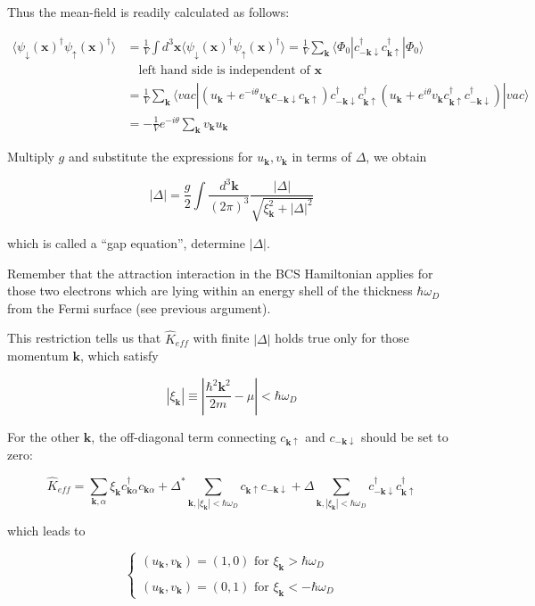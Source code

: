 Thus the mean-field is readily calculated as follows: %

\[\begin{split}
\langle\psi_{\downarrow}(\bm{x})^\dagger\psi_{\uparrow}(\bm{x})^\dagger\rangle &= \frac{1}{V}\int d^3 \bm{x} \langle\psi_{\downarrow}(\bm{x})^\dagger\psi_{\uparrow}(\bm{x})^\dagger\rangle = \frac{1}{V} \sum_{\bm{k}}\langle\Phi_0|c_{-\bm{k}\downarrow}^\dagger c_{\bm{k}\uparrow}^\dagger|\Phi_0\rangle \\
&\quad\text{left hand side is independent of }\bm{x}\\
&= \frac{1}{V}\sum_{\bm{k}}\langle vac|(u_{\bm{k}}+e^{-i\theta}v_{\bm{k}}c_{-\bm{k}\downarrow}c_{\bm{k}\uparrow})c_{-\bm{k}\downarrow}^\dagger c_{\bm{k}\uparrow}^\dagger (u_{\bm{k}}+e^{i\theta}v_{\bm{k}}c_{\bm{k}\uparrow}^\dagger c_{-\bm{k}\downarrow}^\dagger)|vac\rangle\\
&= -\frac{1}{V}e^{-i\theta}\sum_{\bm{k}}v_{\bm{k}}u_{\bm{k}}
\end{split}\]

Multiply $g$ and substitute the expressions for $u_{\bm{k}}, v_{\bm{k}}$ in terms of $\Delta$, we obtain

\[|\Delta| = \frac{g}{2}\int \frac{d^3 \bm{k}}{(2\pi)^3}\frac{|\Delta|}{\sqrt{\xi_{\bm{k}}^2+|\Delta|^2}} \]

which is called a ``gap equation'', determine $|\Delta|$. 

Remember that the attraction interaction in the BCS Hamiltonian applies for those two electrons which are lying within an energy shell of the thickness $\hbar \omega_D$ from the Fermi surface (see previous argument).

This restriction tells us that $\hat{K}_{eff}$ with finite $|\Delta|$ holds true only for those momentum $\bm{k}$, which satisfy

\[|\xi_{\bm{k}}| \equiv |\frac{\hbar^2 \bm{k}^2}{2m}-\mu|<\hbar \omega_D \]

For the other $\bm{k}$, the off-diagonal term connecting $c_{\bm{k}\uparrow}$ and $c_{-\bm{k}\downarrow}$ should be set to zero:

\[\hat{K}_{eff}=\sum_{\bm{k},\alpha}\xi_{\bm{k}}c_{\bm{k}\alpha}^\dagger c_{\bm{k}\alpha}+\Delta^* \sum_{\bm{k},|\xi_{\bm{k}}|<\hbar\omega_D}c_{\bm{k}\uparrow}c_{-\bm{k}\downarrow}+\Delta\sum_{\bm{k},|\xi_{\bm{k}}|<\hbar\omega_D}c_{-\bm{k}\downarrow}^\dagger c_{\bm{k}\uparrow}^\dagger \]

which leads to

\[\begin{cases}
 (u_{\bm{k}},v_{\bm{k}}) = (1,0)\text{ for }\xi_{\bm{k}}>\hbar\omega_D\\
\ \\
(u_{\bm{k}},v_{\bm{k}}) = (0,1)\text{ for }\xi_{\bm{k}}<-\hbar\omega_D
\end{cases}\]

